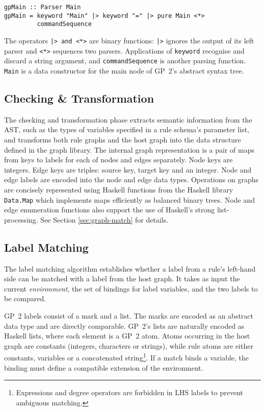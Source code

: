 \begin{verbatim}
gpMain :: Parser Main
gpMain = keyword "Main" |> keyword "=" |> pure Main <*> 
         commandSequence
\end{verbatim}

The operators \texttt{|> and <*>} are binary functions: \texttt{|>} ignores the output of its left parser and \texttt{<*>} sequences two parsers. Applications of \texttt{keyword} recognise and discard a string argument, and \linebreak \texttt{commandSequence} is another parsing function. \texttt{Main} is a data constructor for the main node of GP~2's abstract syntax tree.

\subsection{Checking \& Transformation}

The checking and transformation phase extracts semantic information from the AST, such as the types of variables specified in a rule schema's parameter list, and transforms both rule graphs and the host graph into the data structure defined in the graph library. The internal graph representation is a pair of maps from keys to labels for each of nodes and edges separately. Node keys are integers. Edge keys are triples: source key, target key and an integer. Node and edge labels are encoded into the node and edge data types. Operations on graphs are concisely represented using Haskell functions from the Haskell library \texttt{Data.Map} which implements maps efficiently as balanced binary trees. Node and edge enumeration functions also support the use of Haskell's strong list-processing. See Section \ref{sec:graph-match} for details.

\subsection{Label Matching}
The label matching algorithm establishes whether a label from a rule's left-hand side can be matched with a label from the host graph. It takes as input the current \textit{environment}, the set of bindings for label variables, and the two labels to be compared. 

GP~2 labels consist of a mark and a list. The marks are encoded as an abstract data type and are directly comparable. GP~2's lists are naturally encoded as Haskell lists, where each element is a GP~2 atom. Atoms occurring in the host graph are constants (integers, characters or strings), while rule atoms are either constants, variables or a concatenated string\footnote{Expressions and degree operators are forbidden in LHS labels to prevent ambiguous matching.}. If a match binds a variable, the binding must define a compatible extension of the environment.

